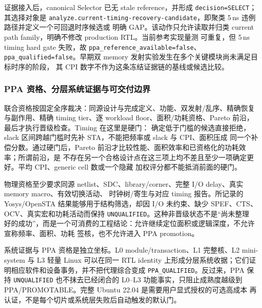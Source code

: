 \documentclass[UTF8,a4paper,zihao=-4,oneside]{ctexart}
\newcommand{\statusword}[1]{\texttt{#1}}
\begin{document}
证据接入后，canonical Selector 已无 stale reference，并形成 \texttt{decision=SELECT}；其选择对象是
\texttt{analyze.current-timing-recovery-candidate}，即聚类 5\,ns 违例路径并定义一个可回退时序候选或
明确 GAP。该动作只允许读取并归类 current path family，明确不修改 production RTL。当前参考实现量测
可重复，但 5\,ns timing hard gate 失败，故 \texttt{ppa\_reference\_available=false}、
\texttt{ppa\_qualified=false}。早期双 memory 发射实验发生在多个关键模块尚未满足目标时序的阶段，
其 CPI 数字不作为这条冻结证据链的基线或候选比较。

\subsubsection{PPA 资格、分层系统证据与可交付边界}

联合资格按固定全序裁决：同源设计与完成定义、功能、双发射/乱序、精确恢复与副作用、精确 timing
tier、逐 workload floor、面积/功耗资格、Pareto 前沿，最后才执行晋级检查。Timing 在这里是硬门：
确定低于门槛的候选直接拒绝，slack 区间跨越门槛时先补 STA，不能把频率或 slack 与 CPI、面积压成
同一个补偿分数。通过硬门后，Pareto 前沿才比较性能、面积效率和已资格化的功耗效率；所谓前沿，是
不存在另一个合格设计点在这三项上均不差且至少一项确定更好。平均 CPI、generic cell 数或一个隐藏
加权评分都不能抵消前面的硬门。

物理资格至少要求同源 netlist、SDC、library/corner、完整 I/O delay、真实 memory macro、有效切换活动、
时钟树/寄生与对应 timing 报告。所记录的 Yosys/OpenSTA 结果能够用于结构筛选，却因 I/O 未约束、缺少
SPEF、CTS、OCV、真实宏和功耗活动而保持 \statusword{UNQUALIFIED}。这种非晋级状态不是“尚未整理
好的成功”，而是一个可消费的工程结论：允许继续定位面积或逻辑深度，不允许宣称频率、面积、功耗
签核，也不允许进入 PPA promotion。

系统证据与 PPA 资格是独立坐标。L0 module/transaction、L1 完整核、L2 mini-system 与 L3 轻量 Linux
可以在同一 RTL identity 上形成分层系统收据；它们证明相应软件和设备事务，并不把代理综合变成
\statusword{PPA\_QUALIFIED}。反过来，PPA 保持 \statusword{UNQUALIFIED} 也不抹去已经闭合的 L0--L3
功能事实，只阻止成熟度越级到 PPA/PROMOTABLE。完整 Ubuntu 22.04 是需要用户显式授权的可选高成本
再认证，不是每个切片或系统层失败后自动触发的默认门。
\end{document}
